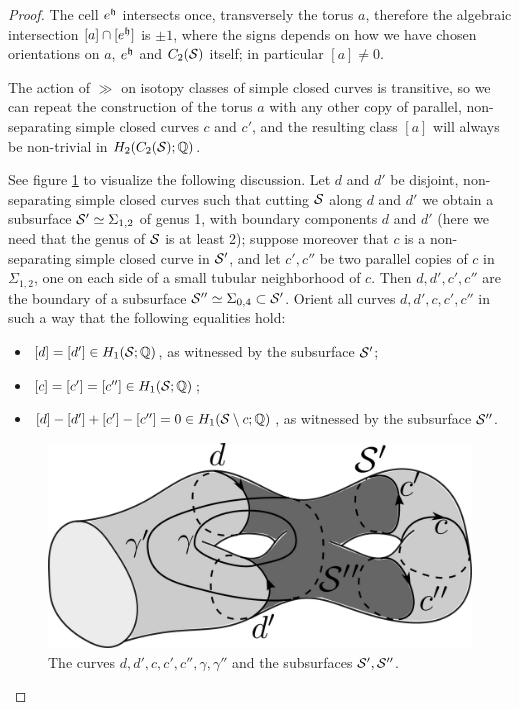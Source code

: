 \begin{proof}
The cell $e^{\tup}$ intersects once, transversely the torus $a$, therefore the
algebraic intersection $[a]\cap[e^{\tup}]$ is $\pm 1$,
where the signs depends on how we have chosen orientations on $a$, $e^{\tup}$ and $C_2(\S)$ itself;
in particular $[a]\neq 0$.

The action of $\gg$ on isotopy classes of simple closed curves is transitive, so we can repeat
the construction of the torus $a$ with any other copy of parallel, non-separating simple closed curves
$c$ and $c'$, and the resulting class $[a]$ will always be non-trivial in $H_2(C_2(\S);\Q)$.

See figure \ref{fig:rational} to visualize the following discussion.
Let $d$ and $d'$ be disjoint, non-separating simple closed curves such that
cutting $\S$ along $d$ and $d'$ we obtain a subsurface $\S'\simeq\Sigma_{1,2}$ of genus 1, with boundary
components $d$ and $d'$ (here we need that the genus of $\S$ is at least 2);
suppose moreover that $c$ is a non-separating simple closed curve in $\S'$,
and let $c',c''$ be two parallel copies of $c$ in $\Sigma_{1,2}$, one on each side of a small tubular
neighborhood of $c$.
Then $d,d',c',c''$ are the boundary of a subsurface $\S''\simeq\Sigma_{0,4}\subset\S'$.
Orient all curves $d,d',c,c',c''$ in such a way that the following equalities hold:
\begin{itemize}
 \item $[d]=[d']\in H_1(\S;\Q)$, as witnessed by the subsurface $\S'$;
 \item $[c]=[c']=[c'']\in H_1(\S;\Q)$;
 \item $[d]-[d']+[c']-[c'']=0\in H_1(\S\setminus c;\Q)$, as witnessed by the subsurface $\S''$.
\end{itemize}

\begin{figure}\centering
 \includegraphics[scale=1.0]{figures/rational.png}
 \caption{The curves $d,d',c,c',c'',\gamma,\gamma''$ and the subsurfaces $\S',\S''$.}
\label{fig:rational}
\end{figure}


\end{proof}
